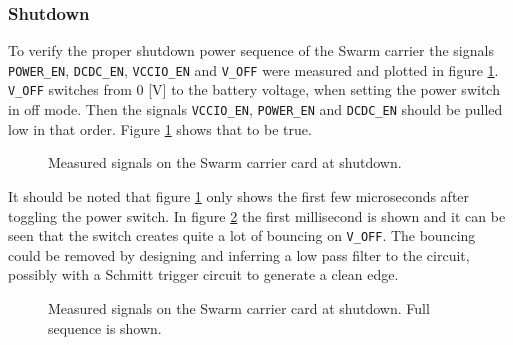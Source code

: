 \subsubsection*{Shutdown}
To verify the proper shutdown power sequence of the Swarm carrier the signals \texttt{POWER\_EN}, \texttt{DCDC\_EN}, \texttt{VCCIO\_EN} and \texttt{V\_OFF} were measured and plotted in figure \ref{fig:shutdown}.
\texttt{V\_OFF} switches from 0 [V] to the battery voltage, when setting the power switch in off mode.
Then the signals \texttt{VCCIO\_EN}, \texttt{POWER\_EN} and \texttt{DCDC\_EN} should be pulled low in that order.
Figure \ref{fig:shutdown} shows that to be true.


\begin{figure}[h]
	\centering
    
	\caption{Measured signals on the Swarm carrier card at shutdown.}
	\label{fig:shutdown}
\end{figure}
It should be noted that figure \ref{fig:shutdown} only shows the first few microseconds after toggling the power switch.
In figure \ref{fig:shutdown_bounce} the first millisecond is shown and it can be seen that the switch creates quite a lot of bouncing on \texttt{V\_OFF}.
The bouncing could be removed by designing and inferring a low pass filter to the circuit, possibly with a Schmitt trigger circuit to generate a clean edge.

\begin{figure}[h]
	\centering
    
	\caption{Measured signals on the Swarm carrier card at shutdown. Full sequence is shown.}
	\label{fig:shutdown_bounce}
\end{figure}


